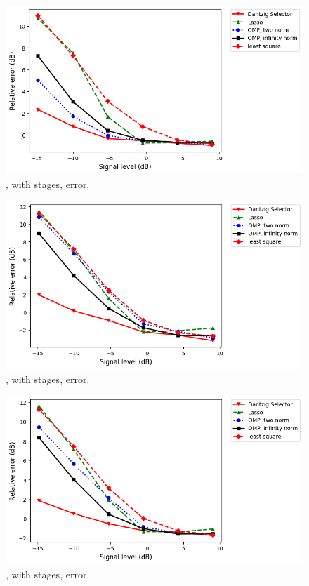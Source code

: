 \begin {figure} [H]
\includegraphics [width = \textwidth] {error-small-wide-two.png}
\caption {, with  stages, error.}
\end {figure}

\begin {figure} [H]
\includegraphics [width = \textwidth] {error-small-square-four.png}
\caption {, with  stages, error.}
\end {figure}

\begin {figure} [H]
\includegraphics [width = \textwidth] {error-small-tall-four.png}
\caption {, with  stages, error.}
\end {figure}


